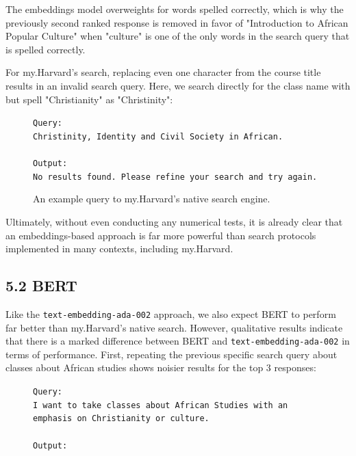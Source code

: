 \documentclass[
	a4paper, %
	10pt, %
	unnumberedsections, %
	twoside, %
]{LTJournalArticle}
\begin{document}
The embeddings model overweights for words spelled correctly, which is why the previously second ranked response is removed in favor of "Introduction to African Popular Culture" when "culture" is one of the only words in the search query that is spelled correctly. 

For my.Harvard's search, replacing even one character from the course title results in an invalid search query. Here, we search directly for the class name with but spell "Christianity" as "Christinity": 


\begin{figure}[h]
	\begin{center}
		\texttt{Query:} \\
		\texttt{Christinity, Identity and Civil Society in African.} \\
		\texttt{}\\
		\texttt{Output: } \\
		\texttt{No results found. Please refine your search and try again. }\\
	\end{center}
	\label{fig:ex4}
	\caption{An example query to my.Harvard's native search engine.}
\end{figure}


Ultimately, without even conducting any numerical tests, it is already clear that an embeddings-based approach is far more powerful than search protocols implemented in many contexts, including my.Harvard. 

\subsection{5.2 BERT}

Like the \texttt{text-embedding-ada-002} 
approach, we also expect BERT to perform far better than my.Harvard's native search. However, qualitative results indicate that there is a marked difference between BERT and \texttt{text-embedding-ada-002} in terms of performance. First, repeating the previous specific search query about classes about African studies shows noisier results for the top $3$ responses: 

\begin{figure}[h]
	\begin{center}
		\texttt{Query:} \\
		\texttt{I want to take classes about African Studies with an emphasis on Christianity or culture.}\\
		\texttt{}\\
		\texttt{Output:}
	\end{center}
\end{figure}
\end{document}
